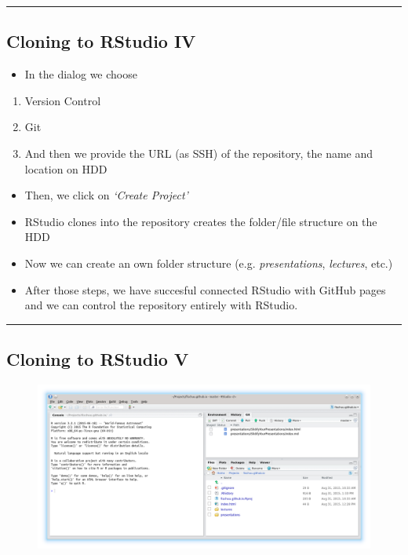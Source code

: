 \begin{center}\rule{0.5\linewidth}{\linethickness}\end{center}

\subsection{Cloning to RStudio IV}\label{cloning-to-rstudio-iv}

\begin{itemize}
\tightlist
\item
  In the dialog we choose
\end{itemize}

\begin{enumerate}
\def\labelenumi{\arabic{enumi}.}
\item
  Version Control
\item
  Git
\item
  And then we provide the URL (as SSH) of the repository, the name and
  location on HDD
\end{enumerate}

\begin{itemize}
\item
  Then, we click on \emph{`Create Project'}
\item
  RStudio clones into the repository creates the folder/file structure
  on the HDD
\item
  Now we can create an own folder structure (e.g. \emph{presentations},
  \emph{lectures}, etc.)
\item
  After those steps, we have succesful connected RStudio with GitHub
  pages and we can control the repository entirely with RStudio.
\end{itemize}

\begin{center}\rule{0.5\linewidth}{\linethickness}\end{center}

\subsection{Cloning to RStudio V}\label{cloning-to-rstudio-v}

\begin{figure}[htbp]
\centering
\includegraphics{assets/img/RStudio3.png}
\caption{}
\end{figure}

